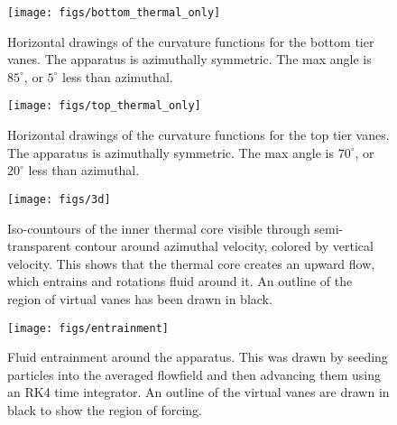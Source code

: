 \begin{figure}[htb]
\centering
\begin{minipage}{0.45\textwidth}
\centering
 \texttt{[image: figs/bottom\_thermal\_only]}
 \caption{Horizontal drawings of the curvature functions for the bottom tier
 vanes. The apparatus is azimuthally symmetric. The max angle is
 $85^{\circ}$, or $5^{\circ}$ less than azimuthal.} 
 \label{fig:thermal_vane_bottom}  
\end{minipage}\hfill
\begin{minipage}{0.45\textwidth}
\centering
\texttt{[image: figs/top\_thermal\_only]}
\caption{Horizontal drawings of the curvature functions for the top tier
 vanes. The apparatus is azimuthally symmetric. The max angle is
 $70^{\circ}$, or $20^{\circ}$ less than azimuthal.} 
 \label{fig:thermal_vane_top}  
\end{minipage}
\end{figure}

\begin{figure}[htb]
\centering
\begin{minipage}{0.45\textwidth}
\centering
 \texttt{[image: figs/3d]}
 \caption{Iso-countours of the inner thermal core
  visible through semi-transparent contour around azimuthal velocity,
  colored by vertical velocity. This shows that the thermal core creates
 an upward flow, which entrains and rotations fluid around it. An
 outline of the region of virtual vanes has been drawn in black.}
 \label{fig:thermal}  
\end{minipage}\hfill
\begin{minipage}{0.45\textwidth}
\centering
\texttt{[image: figs/entrainment]}
\caption{Fluid entrainment around the apparatus. This was drawn by
 seeding particles into the averaged flowfield and then advancing them
 using an RK4 time integrator. An outline of the
  virtual vanes are drawn in black to show the region of forcing.}
 \label{fig:entrain}  
\end{minipage}
\end{figure}





